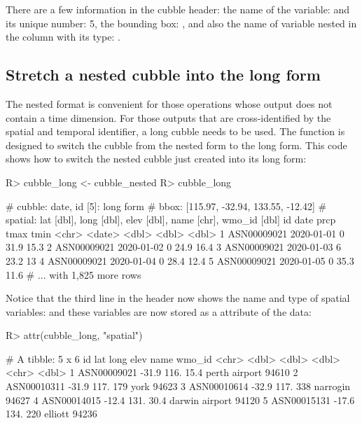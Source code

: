 \documentclass[
]{jss}
\begin{document}
There are a few information in the cubble header: the name of the
 variable:  and its unique number: 5, the bounding
box: \code{[115.97, -32.94, 133.55, -12.42]} , and also the name of
variable nested in the  column with its type:
.

\hypertarget{stretch-a-nested-cubble-into-the-long-form}{%
\subsection{Stretch a nested cubble into the long
form}\label{stretch-a-nested-cubble-into-the-long-form}}

The nested format is convenient for those operations whose output does
not contain a time dimension. For those outputs that are
cross-identified by the spatial and temporal identifier, a long cubble
needs to be used. The function  is designed to switch
the cubble from the nested form to the long form. This code shows how to
switch the nested cubble just created into its long form:

\begin{CodeChunk}
\begin{CodeInput}
R> cubble_long <- cubble_nested %
R> cubble_long
\end{CodeInput}
\begin{CodeOutput}
# cubble:  date, id [5]: long form
# bbox:    [115.97, -32.94, 133.55, -12.42]
# spatial: lat [dbl], long [dbl], elev [dbl], name [chr], wmo_id [dbl]
  id          date        prcp  tmax  tmin
  <chr>       <date>     <dbl> <dbl> <dbl>
1 ASN00009021 2020-01-01     0  31.9  15.3
2 ASN00009021 2020-01-02     0  24.9  16.4
3 ASN00009021 2020-01-03     6  23.2  13  
4 ASN00009021 2020-01-04     0  28.4  12.4
5 ASN00009021 2020-01-05     0  35.3  11.6
# ... with 1,825 more rows
\end{CodeOutput}
\end{CodeChunk}

Notice that the third line in the header now shows the name and type of
spatial variables:
 and
these variables are now stored as a  attribute of the
data:

\begin{CodeChunk}
\begin{CodeInput}
R> attr(cubble_long, "spatial")
\end{CodeInput}
\begin{CodeOutput}
# A tibble: 5 x 6
  id            lat  long  elev name           wmo_id
  <chr>       <dbl> <dbl> <dbl> <chr>           <dbl>
1 ASN00009021 -31.9  116.  15.4 perth airport   94610
2 ASN00010311 -31.9  117. 179   york            94623
3 ASN00010614 -32.9  117. 338   narrogin        94627
4 ASN00014015 -12.4  131.  30.4 darwin airport  94120
5 ASN00015131 -17.6  134. 220   elliott         94236
\end{CodeOutput}
\end{CodeChunk}
\end{document}
